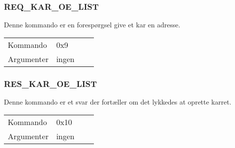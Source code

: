 \subsubsection{REQ\_KAR\_OE\_LIST}
Denne kommando er en forespørgsel give et kar en adresse.

\begin{table}[H]
\setlength{\parindent}{12pt}
\begin{tabular}{|l|lcc|}
Kommando & 0x9 & & \\
Argumenter & ingen & & \\
\end{tabular}
\end{table}


\subsubsection{RES\_KAR\_OE\_LIST}
Denne kommando er et svar der fortæller om det lykkedes at oprette karret.

\begin{table}[H]
\setlength{\parindent}{12pt}
\begin{tabular}{|l|lcc|}
Kommando & 0x10 & & \\
Argumenter & ingen & & \\
\end{tabular}
\end{table}
